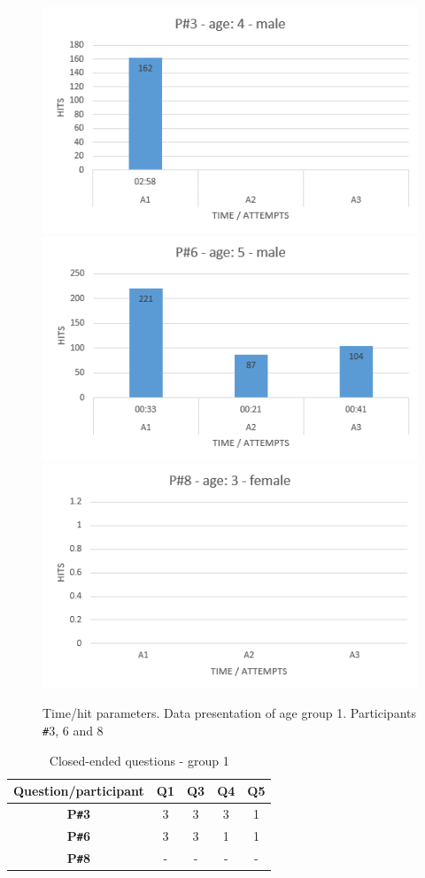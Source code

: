 \begin{figure}[!ht]

    \centering
    \includegraphics[width=.6\textwidth]{figures/p3.png}
    \includegraphics[width=.6\textwidth]{figures/p6.png}
        \includegraphics[width=.6\textwidth]{figures/p8.png}
    \caption{Time/hit parameters. Data presentation of age group 1. Participants \texttt{\#}3, 6 and 8}
    \label{fig:agegroup1}
\end{figure}

\begin{table}[!ht]
    \centering
    \begin{tabular}{c|c|c|c|c}
    \hline
    \multicolumn{1}{|c|}{\textbf{Question/participant}} &
    \multicolumn{1}{c|}{\textbf{Q1}} &
    \multicolumn{1}{c|}{\textbf{Q3}} &
    \multicolumn{1}{c|}{\textbf{Q4}} &
    \multicolumn{1}{c|}{\textbf{Q5}} \\ \hline
    \multicolumn{1}{|c|}{\textbf{P\texttt{\#}3}} &
    \multicolumn{1}{c|}{3} &
    \multicolumn{1}{c|}{3} &
    \multicolumn{1}{c|}{3} &
    \multicolumn{1}{c|}{1} \\ \hline
    \multicolumn{1}{|c|}{\textbf{P\texttt{\#}6}} &
    \multicolumn{1}{c|}{3} &
    \multicolumn{1}{c|}{3} &
    \multicolumn{1}{c|}{1} &
    \multicolumn{1}{c|}{1} \\ \hline
    \multicolumn{1}{|c|}{\textbf{P\texttt{\#}8}} &
    \multicolumn{1}{c|}{-} &
    \multicolumn{1}{c|}{-} &
    \multicolumn{1}{c|}{-} &
    \multicolumn{1}{c|}{-} \\ \hline
    \end{tabular}
    \caption{Closed-ended questions - group 1}
    \label{tab:closedendedquestiongroup1}
\end{table}

